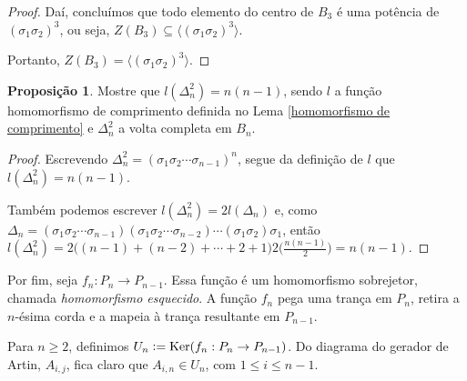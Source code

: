 \documentclass[a4paper,portuguese,11pt,twoside, leqno]{book}
\DeclareMathOperator{\Ker}{Ker}
\theoremstyle{definition}
\newtheorem{theorem}{Teorema}[section]
\newtheorem{remark}{Observação}[section]
\newtheorem{prop}{Proposição}[section]
\begin{document}
\begin{proof}
		\par\vspace{0.3cm} Daí, concluímos que todo elemento do centro de $B_3$ é uma potência de $(\sigma_1\sigma_2)^3$, ou seja, $Z(B_3)\subseteq\langle (\sigma_1\sigma_2)^3 \rangle$.
		
		\par\vspace{0.3cm} Portanto, $Z(B_3) = \langle (\sigma_1\sigma_2)^3 \rangle$.
		
	\end{proof}
	
	\begin{prop}
		Mostre que $l(\Delta_n^2) = n(n-1)$, sendo $l$ a função homomorfismo de comprimento definida no Lema \eqref{homomorfismo de comprimento} e $\Delta_n^2$ a volta completa em $B_n$.
	\end{prop}
	
	\begin{proof}
		Escrevendo $\Delta_n^2 = (\sigma_1\sigma_2\cdots\sigma_{n-1})^n$, segue da definição de $l$ que $l(\Delta_n^2) = n(n-1)$. 
		
		\par\vspace{0.3cm} Também podemos escrever $l(\Delta_n^2) = 2l(\Delta_n)$ e, como $\Delta_n = (\sigma_1\sigma_2\cdots\sigma_{n-1})(\sigma_1\sigma_2\cdots\sigma_{n-2})\cdots(\sigma_1\sigma_2)\sigma_1$, então $l(\Delta_n^2) = 2\Big( (n-1) + (n-2) + \cdots + 2 + 1 \Big) 2\Big( \displaystyle{\frac{n(n-1)}{2}} \Big) = n(n-1)$.
		
	\end{proof}
	
	
	
	
	
	\par\vspace{0.3cm} Por fim, seja $f_n: P_n\to P_{n-1}$. Essa função é um homomorfismo sobrejetor, chamada \textit{homomorfismo esquecido}. A função $f_n$ pega uma trança em $P_n$, retira a $n$-ésima corda e a mapeia à trança resultante em $P_{n-1}$.
	\par\vspace{0.3cm} Para $n\geq 2$, definimos $U_n\vcentcolon=\Ker(f_n: P_n\to P_{n-1})$. Do diagrama do gerador de Artin, $A_{i,j}$, fica claro que $A_{i,n}\in U_n$, com $1\leq i\leq n-1$. 
	
\end{document}
